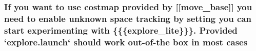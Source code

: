 \subsubsection[{\texorpdfstring{with}{with}}]{\setlength{\rightskip}{0pt plus 5cm}If you want {\bf to} use costmap provided by \mbox{[}\mbox{[}move\+\_\+base\mbox{]}\mbox{]} you need {\bf to} enable unknown space tracking by setting you can start experimenting with \{\{\{explore\+\_\+lite\}\}\}. Provided `explore.\+launch` should work out-\/of-\/the box in most cases}\hypertarget{wiki__doc_8txt_a110243189100ad190f1295ade52a39a6}{}\label{wiki__doc_8txt_a110243189100ad190f1295ade52a39a6}
